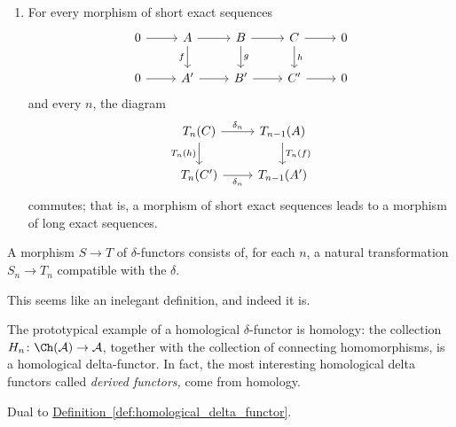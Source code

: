 \documentclass[main.tex]{subfiles}
\begin{document}
\begin{definition}
\begin{enumerate}
    \item For every morphism of short exact sequences
      \begin{equation*}
        \begin{tikzcd}
          0
          \arrow[r]
          & A
          \arrow[r]
          \arrow[d, swap, "f"]
          & B
          \arrow[r]
          \arrow[d, "g"]
          & C
          \arrow[r]
          \arrow[d, "h"]
          & 0
          \\
          0
          \arrow[r]
          & A'
          \arrow[r]
          & B'
          \arrow[r]
          & C'
          \arrow[r]
          & 0
        \end{tikzcd}
      \end{equation*}
      and every $n$, the diagram
      \begin{equation*}
        \begin{tikzcd}
          T_{n}(C)
          \arrow[r, "\delta_{n}"]
          \arrow[d, swap, "T_{n}(h)"]
          & T_{n-1}(A)
          \arrow[d, "T_{n}(f)"]
          \\
          T_{n}(C')
          \arrow[r, swap, "\delta_{n}"]
          & T_{n-1}(A')
        \end{tikzcd}
      \end{equation*}
      commutes; that is, a morphism of short exact sequences leads to a morphism of long exact sequences.
  \end{enumerate}

  A morphism $S \to T$ of $\delta$-functors consists of, for each $n$, a natural transformation $S_{n} \to T_{n}$ compatible with the $\delta$.
\end{definition}

This seems like an inelegant definition, and indeed it is.

\begin{example}
  The prototypical example of a homological $\delta$-functor is homology: the collection $H_{n}\colon \Ch(\mathcal{A}) \to \mathcal{A}$, together with the collection of connecting homomorphisms, is a homological delta-functor. In fact, the most interesting homological delta functors called \emph{derived functors,} come from homology.
\end{example}

\begin{definition}
  \label{def:cohomological_delta_functors}
  Dual to \hyperref[def:homological_delta_functor]{Definition~\ref*{def:homological_delta_functor}}.
\end{definition}
\end{document}
